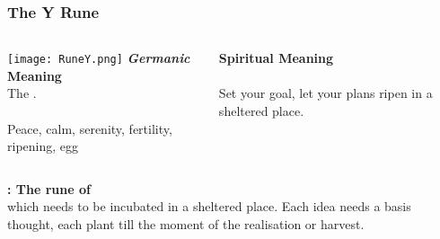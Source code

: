 \begin{frame}
\frametitle{The Y Rune}
\begin{columns}[c] %

\texttt{[image: RuneY.png]}
\textbf{\textit{Germanic} Meaning}\\
The . \\
\\
Peace, calm, serenity, fertility, ripening, egg

\textbf{Spiritual Meaning}\\
\\

Set your goal, let your plans ripen in a sheltered place.
\end{columns}

\vspace{5mm}
\textbf{: The rune of }\\
 which needs to be incubated in a sheltered place. Each idea needs a basis thought, each plant  till the moment of the realisation or harvest.
\end{frame}

